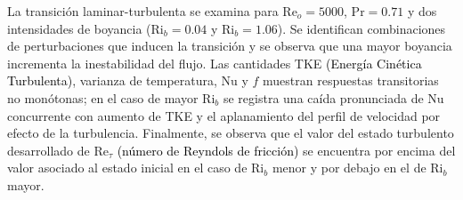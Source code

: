 \begin{resumen}
La transición laminar-turbulenta se examina para $\mathrm{Re}_o=5000$, $\mathrm{Pr}=0\text{.}71$ y dos intensidades de boyancia ($\mathrm{Ri}_b=0\text{.}04$ y $\mathrm{Ri}_b=1\text{.}06$). Se identifican combinaciones de perturbaciones que inducen la transición y se observa que una mayor boyancia incrementa la inestabilidad del flujo. Las cantidades TKE \textcolor{black}{(Energía Cinética Turbulenta)}, varianza de temperatura, Nu y $f$ muestran respuestas transitorias no monótonas; en el caso de mayor $\mathrm{Ri}_b$ se registra una caída pronunciada de Nu concurrente con aumento de TKE y el aplanamiento del perfil de velocidad por efecto de la turbulencia. Finalmente, se observa que el valor del estado turbulento desarrollado de $\mathrm{Re}_\tau$ \textcolor{black}{(número de Reyndols de fricción)} se encuentra por encima del valor asociado al estado inicial en el caso de $\mathrm{Ri}_b$ menor y por debajo en el de $\mathrm{Ri}_b$ mayor.

\end{resumen}


